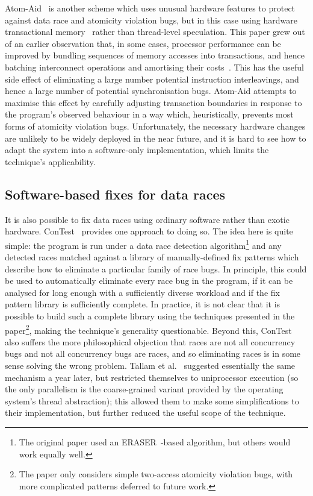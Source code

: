 Atom-Aid~\cite{Lucia2009} is another scheme which uses unusual
hardware features to protect against data race and atomicity violation
bugs, but in this case using hardware transactional
memory~\cite{Herlihy1993} rather than thread-level speculation.  This
paper grew out of an earlier observation that, in some cases,
processor performance can be improved by bundling sequences of memory
accesses into transactions, and hence batching interconnect operations
and amortising their costs~\cite{Ceze2007}.  This has the useful side
effect of eliminating a large number potential instruction
interleavings, and hence a large number of potential synchronisation
bugs.  Atom-Aid attempts to maximise this effect by carefully
adjusting transaction boundaries in response to the program's observed
behaviour in a way which, heuristically, prevents most forms of
atomicity violation bugs.  Unfortunately, the necessary hardware
changes are unlikely to be widely deployed in the near future, and it
is hard to see how to adapt the system into a software-only
implementation, which limits the technique's applicability.

\subsection{Software-based fixes for data races}
It is also possible to fix data races using ordinary software rather
than exotic hardware.  ConTest~\cite{Krena2007} provides one approach
to doing so.  The idea here is quite simple: the program is run under
a data race detection algorithm\footnote{The original paper used an
  ERASER~\cite{Savage1997}-based algorithm, but others would work
  equally well.} and any detected races matched against a library of
manually-defined fix patterns which describe how to eliminate a
particular family of race bugs.  In principle, this could be used to
automatically eliminate every race bug in the program, if it can be
analysed for long enough with a sufficiently diverse workload and if
the fix pattern library is sufficiently complete.  In practice, it is
not clear that it is possible to build such a complete library using
the techniques presented in the paper\footnote{The paper only
  considers simple two-access atomicity violation bugs, with more
  complicated patterns deferred to future work.}\hspace{-1ex}, making the
technique's generality questionable.  Beyond this, ConTest also
suffers the more philosophical objection that races are not all
concurrency bugs and not all concurrency bugs are races, and so
eliminating races is in some sense solving the wrong problem.  Tallam
et al.~\cite{Tallam2008} suggested essentially the same mechanism a
year later, but restricted themselves to uniprocessor execution (so
the only parallelism is the coarse-grained variant provided by the
operating system's thread abstraction); this allowed them to make some
simplifications to their implementation, but further reduced the
useful scope of the technique.

